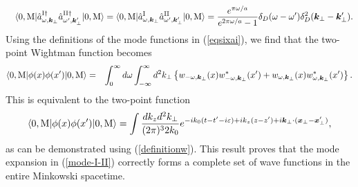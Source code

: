 \documentclass[aps,prd,preprintnumbers,nofootinbib,showpacs,11pt]{revtex4}%
\begin{document}
\begin{widetext}
\begin{eqnarray}
\nonumber
\\
&&\langle0,{\rm M}|\hat a_{\omega,{\bm k}_\perp}^{\rm I \dagger}\hat a_{\omega',{\bm k}_\perp'}^{\rm II \dagger}|0,{\rm M}\rangle
= \langle0,{\rm M}|\hat a_{\omega,{\bm k}_\perp}^{\rm I }\hat a_{\omega',{\bm k}_\perp'}^{\rm II}|0,{\rm M}\rangle
={e^{\pi\omega/a}\over e^{2\pi\omega/a}-1}\delta_D(\omega-\omega')\delta_D^2(\bm k_\perp-\bm k_\perp').
\nonumber
\end{eqnarray}
Using the definitions of the mode functions in (\ref{eqsixai}), 
we find that the two-point Wightman function becomes
\begin{eqnarray}
\langle0,{\rm M}|\phi(x)\phi(x')|0,{\rm M}\rangle
&=&\int_0^{\infty}d\omega\int_{-\infty}^{\infty} 
 d^2 k_\perp \left\{ w_{-\omega,\bm k_\perp}(x)w^*_{-\omega,\bm k_\perp}(x')
+w_{\omega,\bm k_\perp}(x)w^*_{\omega,\bm k_\perp}(x')\right\}.
\end{eqnarray}
This is equivalent to the two-point function 
\begin{eqnarray}
  \langle0,{\rm M}|\phi(x)\phi(x')|0,{\rm M}\rangle=\int {dk_zd^2 k_\perp\over (2\pi)^{3}2k_0}
{e^{-i k_0 (t-t'-i\varepsilon)+ik_z(z-z')+i\bm k_\perp\cdot(\bm x_\perp-\bm x_\perp')} },
\end{eqnarray}
as can be demonstrated using (\ref{definitionw}).
This result proves that the mode expansion in (\ref{mode-I-II}) correctly forms a complete set of wave functions
in the entire Minkowski spacetime.

\end{widetext}
\end{document}
